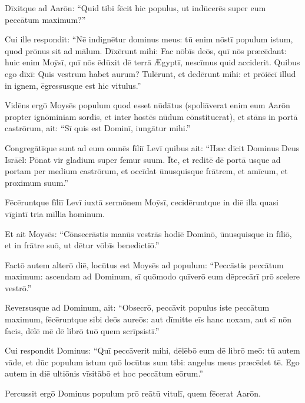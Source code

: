 Dīxitque ad Aarōn: ``Quid
tibi fēcit hic populus, ut indūcerēs super eum peccātum maximum?''

Cui
ille respondit: ``Nē indignētur dominus meus: tū enim nōstī
populum istum, quod prōnus sit ad mālum. 
Dīxērunt mihi: Fac nōbīs
deōs, quī nōs præcēdant: huic enim Moȳsī, quī nōs ēdūxit dē terrā Ægyptī,
nescīmus quid acciderit. 
Quibus ego dīxī: Quis vestrum habet aurum?
Tulērunt, et dedērunt mihi: et prōiēcī illud in ignem, ēgressusque est hic
vitulus.'' 

Vidēns ergō Moysēs populum
quod esset nūdātus (spoliāverat enim eum Aarōn propter
ignōminiam sordis, et inter hostēs nūdum cōnstituerat), 
et stāns in portā castrōrum, ait: ``Sī quis est Dominī, iungātur mihi.''

Congregātīque sunt ad eum omnēs fīliī Levī 
quibus ait: ``Hæc dīcit
Dominus Deus Isrāēl: Pōnat vir gladium super femur suum. Īte, et reditē
dē portā usque ad portam per medium castrōrum, et occīdat ūnusquisque
frātrem, et amīcum, et proximum suum.''

Fēcēruntque fīliī Levī iuxtā
sermōnem Moȳsī, cecidēruntque in diē illa quasi vīgintī tria mīllia
hominum. 

Et ait Moysēs: ``Cōnsecrāstis
manūs vestrās hodiē Dominō, ūnusquisque in fīliō, et in frātre suō, ut
dētur vōbīs benedictiō.''

Factō autem alterō diē, locūtus
est Moysēs ad populum: ``Peccāstis peccātum maximum: ascendam ad Dominum,
sī quōmodo quīverō eum dēprecārī prō scelere vestrō.''

Reversusque ad
Dominum, ait: ``Obsecrō, peccāvit populus
iste peccātum maximum, fēcēruntque sibi deōs aureōs: aut dīmitte eīs hanc
noxam, 
aut sī nōn facis, dēlē mē dē librō tuō quem
scrīpsistī.'' 

Cui respondit Dominus: ``Quī peccāverit mihi, dēlēbō eum dē
librō meō: 
tū autem vāde, et dūc populum istum quō locūtus sum tibi:
angelus meus præcēdet tē. Ego autem in diē
ultiōnis vīsitābō et hoc peccātum
eōrum.''

Percussit ergō Dominus populum prō reātū vitulī,
quem fēcerat Aarōn. 
